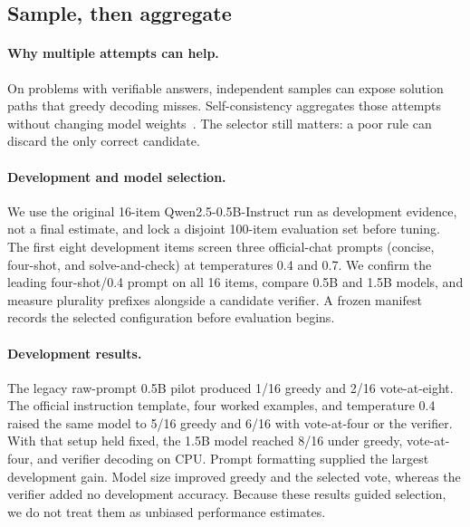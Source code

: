 \documentclass[11pt]{article}
\begin{document}
\subsection{Sample, then aggregate}\label{sec:selfcons}

\paragraph{Why multiple attempts can help.} On problems with verifiable
answers, independent samples can expose solution paths that greedy decoding
misses. Self-consistency aggregates those attempts without changing model
weights~\cite{wang2022selfconsistency}. The selector still matters: a poor
rule can discard the only correct candidate.

\paragraph{Development and model selection.} We use the original 16-item
Qwen2.5-0.5B-Instruct run as development evidence, not a final estimate, and
lock a disjoint 100-item evaluation set before tuning. The first eight
development items screen three official-chat prompts (concise, four-shot, and
solve-and-check) at temperatures 0.4 and 0.7. We confirm the leading
four-shot/0.4 prompt on all 16 items, compare 0.5B and 1.5B models, and measure
plurality prefixes alongside a candidate verifier. A frozen manifest records
the selected configuration before evaluation begins.

\paragraph{Development results.} The legacy raw-prompt 0.5B pilot produced
1/16 greedy and 2/16 vote-at-eight. The official instruction template, four
worked examples, and temperature 0.4 raised the same model to 5/16 greedy and
6/16 with vote-at-four or the verifier. With that setup held fixed, the 1.5B
model reached 8/16 under greedy, vote-at-four, and verifier decoding on CPU.
Prompt formatting supplied the largest development gain. Model size improved
greedy and the selected vote, whereas the verifier added no development
accuracy. Because these results guided selection, we do not treat them as
unbiased performance estimates.
\end{document}
